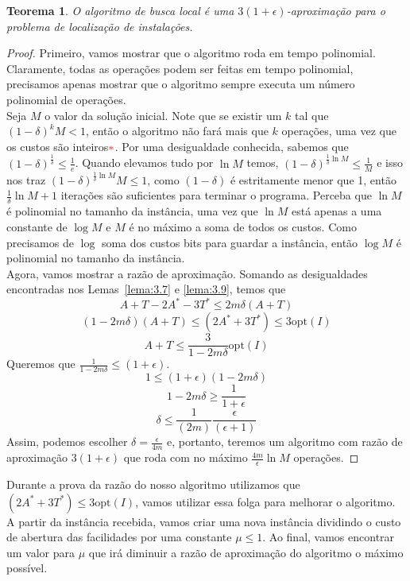 \documentclass[12pt]{article}
\newcommand{\opt}{\ensuremath{\mathrm{opt}}}
\newtheorem{theorem}{Teorema}[section]
\newcommand{\red}[1]{{\color{red}{#1}}}
\begin{document}
\begin{theorem}
    O algoritmo de busca local é uma $3(1+\epsilon)$-aproximação para o problema de localização de instalações.
\end{theorem}
\begin{proof}
    Primeiro, vamos mostrar que o algoritmo roda em tempo polinomial. Claramente, todas as operações podem ser feitas em tempo polinomial, precisamos apenas mostrar que o algoritmo sempre executa um número polinomial de operações. \\
    Seja $M$ o valor da solução inicial. Note que se existir um $k$ tal que $(1-\delta)^kM < 1$, então o algoritmo não fará mais que $k$ operações, uma vez que os custos são inteiros$\red{*}$. Por uma desigualdade conhecida, sabemos que $(1 - \delta)^{\frac{1}{\delta}} \leq \frac{1}{e}$. Quando elevamos tudo por $\ln M$ temos, $(1- \delta)^{\frac{1}{\delta}\ln M} \leq \frac{1}{M}$ e isso nos traz $ (1- \delta)^{\frac{1}{\delta}\ln M}M \leq 1$, como $(1-\delta)$ é estritamente menor que 1, então $\frac{1}{\delta}\ln M + 1$ iterações são suficientes para terminar o programa. Perceba que $\ln M$ é polinomial no tamanho da instância, uma vez que $\ln M$ está apenas a uma constante de $\log M$ e $M$ é no máximo a soma de todos os custos. Como precisamos de $\log$ soma dos custos bits para guardar a instância, então $\log M$ é polinomial no tamanho da instância. \\
    Agora, vamos mostrar a razão de aproximação. Somando as desigualdades encontradas nos Lemas~\ref{lema:3.7} e \ref{lema:3.9}, temos que 
        \[A + T - 2A^* - 3T^* \leq 2m\delta(A+T)\] 
        \[(1 - 2m\delta)(A+T) \leq (2A^* + 3T^*) \leq 3 \opt(I)\]
        \[A+T \leq \frac{3}{1-2m\delta}\opt(I)\]
    Queremos que $\frac{1}{1-2m\delta}\leq (1+\epsilon)$.
    \[1 \leq (1+\epsilon)(1-2m\delta)\]
    \[1 - 2m\delta \geq \frac{1}{1+\epsilon}\]
    \[\delta \leq \frac{1}{(2m)} \frac{\epsilon}{(\epsilon+1)}\]
    Assim, podemos escolher $\delta = \frac{\epsilon}{4m}$ e, portanto, teremos um algoritmo com razão de aproximação $3(1+\epsilon)$ que roda com no máximo $\frac{4m}{\epsilon}\ln M$ operações.
\end{proof}
Durante a prova da razão do nosso algoritmo utilizamos que $(2A^* + 3T^*) \leq 3\opt(I)$, vamos utilizar essa folga para melhorar o algoritmo. \\
A partir da instância recebida, vamos criar uma nova instância dividindo o custo de abertura das facilidades por uma constante $\mu \leq 1$. Ao final, vamos encontrar um valor para $\mu$ que irá diminuir a razão de aproximação do algoritmo o máximo possível. \\
\end{document}
